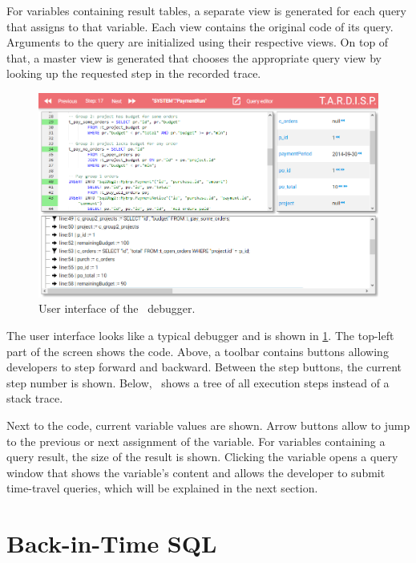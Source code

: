 For variables containing result tables, a separate view is generated for each query that assigns to that variable.
Each view contains the original code of its query.
Arguments to the query are initialized using their respective views.
On top of that, a master view is generated that chooses the appropriate query view by looking up the requested step in the recorded trace.

\begin{figure}
	\centering
		\includegraphics[width=\linewidth]{img/odb.png}
	\caption{User interface of the \tool\ debugger.}
	\label{fig:odb}
\end{figure}

The user interface looks like a typical debugger and is shown in \cref{fig:odb}.
The top-left part of the screen shows the code.
Above, a toolbar contains buttons allowing developers to step forward and backward.
Between the step buttons, the current step number is shown.
Below, \tool\ shows a tree of all execution steps instead of a stack trace.

Next to the code, current variable values are shown.
Arrow buttons allow to jump to the previous or next assignment of the variable.
For variables containing a query result, the size of the result is shown.
Clicking the variable opens a query window that shows the variable's content and allows the developer to submit time-travel queries, which will be explained in the next section.

\section{Back-in-Time SQL}



